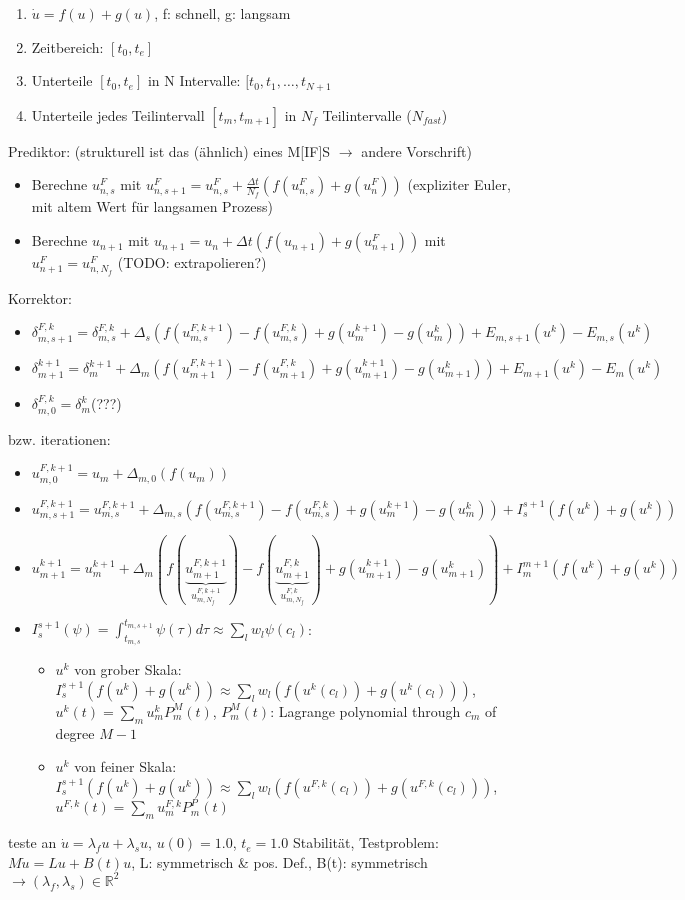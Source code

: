 \documentclass{article}
\begin{document}
 \begin{enumerate}
  \item $\dot u=f(u)+g(u)$, f: schnell, g: langsam
  \item Zeitbereich: $[t_0,t_e]$
  \item Unterteile $[t_0,t_e]$ in N Intervalle: $[t_0,t_1,\dots,t_{N+1}$
  \item Unterteile jedes Teilintervall $[t_m,t_{m+1}]$ in $N_f$ Teilintervalle ($N_{fast}$)
 \end{enumerate}

 Prediktor: (strukturell ist das (ähnlich) eines M[IF]S $\rightarrow$ andere Vorschrift)
 \begin{itemize}
  \item Berechne $u_{n,s}^F$ mit $u_{n,s+1}^F=u_{n,s}^F+\frac{\Delta t}{N_f} (f(u_{n,s}^F)+g(u_n^F))$ (expliziter Euler, mit altem Wert für langsamen Prozess)
  \item Berechne $u_{n+1}$ mit $u_{n+1}=u_{n}+\Delta t(f(u_{n+1})+g(u_{n+1}^F))$ mit $u_{n+1}^F=u_{n,N_{f}}^F$ (TODO: extrapolieren?)
 \end{itemize}

 Korrektor:
 \begin{itemize}
  \item $\delta_{m,s+1}^{F,k}=\delta^{F,k}_{m,s}+\Delta_{s}(f(u_{m,s}^{F,k+1})-f(u_{m,s}^{F,k})+g(u_{m}^{k+1})-g(u_m^k))+E_{m,s+1}(u^k)-E_{m,s}(u^k)$
  \item $\delta_{m+1}^{k+1}=\delta_{m}^{k+1}+\Delta_m (f(u_{m+1}^{F,k+1})-f(u_{m+1}^{F,k})+g(u_{m+1}^{k+1})-g(u_{m+1}^k))+E_{m+1}(u^k)-E_{m}(u^k)$
  \item $\delta_{m,0}^{F,k}=\delta_{m}^k$(???)
 \end{itemize}
 bzw. iterationen:
  \begin{itemize}
   \item $u_{m,0}^{F,k+1}=u_{m}+\Delta_{m,0} (f(u_m))$
   \item $u_{m,s+1}^{F,k+1}=u_{m,s}^{F,k+1}+\Delta_{m,s}(f(u_{m,s}^{F,k+1})-f(u_{m,s}^{F,k})+g(u_{m}^{k+1})-g(u_m^k))+I_{s}^{s+1}(f(u^k)+g(u^k))$
   \item $u_{m+1}^{k+1}=u_{m}^{k+1}+\Delta_{m} (f(\underbrace{u^{F,k+1}_{m+1}}_{u^{F,k+1}_{m,N_f}})-f(\underbrace{u^{F,k}_{m+1}}_{u^{F,k}_{m,N_f}})+g(u_{m+1}^{k+1})-g(u_{m+1}^k))+I_{m}^{m+1}(f(u^k)+g(u^k))$
   \item $I_s^{s+1}(\psi)=\int_{t_{m,s}}^{t_{m,s+1}} \psi(\tau) d\tau\approx \sum_l w_l \psi(c_l)$:
    \begin{itemize}
     \item $u^k$ von grober Skala: $I_{s}^{s+1}(f(u^k)+g(u^k))\approx \sum_l w_l( f(u^k(c_l))+g(u^k(c_l)))$, $u^k(t)=\sum_m u^k_m P_m^M(t)$, $P_m^M(t)$: Lagrange polynomial through $c_m$ of degree $M-1$
     \item $u^k$ von feiner Skala: $I_s^{s+1} (f(u^k)+g(u^k))\approx \sum_l w_l (f(u^{F,k}(c_l))+g(u^{F,k}(c_l)))$, $u^{F,k}(t)=\sum_m u^{F,k}_m P_m^P(t)$
    \end{itemize}
  \end{itemize}
  teste an $\dot u=\lambda_fu + \lambda_s u$, $u(0)=1.0$, $t_e=1.0$
 Stabilität, Testproblem: $M\dot u = Lu+B(t)u$, L: symmetrisch \& pos. Def., B(t): symmetrisch $\rightarrow (\lambda_f, \lambda_s)\in \mathbb{R}^2$
 
\end{document}
